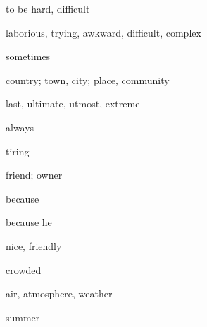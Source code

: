\documentclass[avery5371,grid,frame]{flashcards}
\begin{document}
\begin{flashcard}{\LARGE to be hard, difficult}
\LARGE {}
\end{flashcard}
\begin{flashcard}{\LARGE laborious, trying, awkward, difficult, complex}
\LARGE {}
\end{flashcard}
\begin{flashcard}{\LARGE sometimes}
\LARGE {}
\end{flashcard}
\begin{flashcard}{\LARGE country; town, city; place, community}
\LARGE {}
\end{flashcard}
\begin{flashcard}{\LARGE last, ultimate, utmost, extreme}
\LARGE {}
\end{flashcard}
\begin{flashcard}{\LARGE always}
\LARGE {}
\end{flashcard}
\begin{flashcard}{\LARGE tiring}
\LARGE {}
\end{flashcard}
\begin{flashcard}{\LARGE friend; owner}
\LARGE {}
\end{flashcard}
\begin{flashcard}{\LARGE because}
\LARGE {}
\end{flashcard}
\begin{flashcard}{\LARGE because he}
\LARGE {}
\end{flashcard}
\begin{flashcard}{\LARGE nice, friendly}
\LARGE {}
\end{flashcard}
\begin{flashcard}{\LARGE crowded}
\LARGE {}
\end{flashcard}
\begin{flashcard}{\LARGE air, atmosphere, weather}
\LARGE {}
\end{flashcard}
\begin{flashcard}{\LARGE summer}
\LARGE {}
\end{flashcard}
\end{document}
